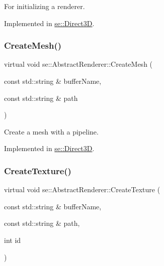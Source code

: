 For initializing a renderer. 

Implemented in \mbox{\hyperlink{classse_1_1_direct3_d_a0174f6e1436fa4171380cc603ca262f0}{se\+::\+Direct3D}}.

\mbox{\label{classse_1_1_abstract_renderer_a4a3e8836f7a8b1b35a5f7cb1b4231476}} 
\subsubsection{\texorpdfstring{Create\+Mesh()}{CreateMesh()}}
{\footnotesize\ttfamily virtual void se\+::\+Abstract\+Renderer\+::\+Create\+Mesh (\begin{DoxyParamCaption}\item[{const std\+::string \&}]{buffer\+Name,  }\item[{const std\+::string \&}]{path }\end{DoxyParamCaption})\hspace{0.3cm}{\ttfamily [pure virtual]}}

Create a mesh with a pipeline. 

Implemented in \mbox{\hyperlink{classse_1_1_direct3_d_aab3d1a8b4ee8812dea07f5ecda5efc42}{se\+::\+Direct3D}}.

\mbox{\label{classse_1_1_abstract_renderer_a89f2efd2ee68cfb6735e51ce87206dfd}} 
\subsubsection{\texorpdfstring{Create\+Texture()}{CreateTexture()}}
{\footnotesize\ttfamily virtual void se\+::\+Abstract\+Renderer\+::\+Create\+Texture (\begin{DoxyParamCaption}\item[{const std\+::string \&}]{buffer\+Name,  }\item[{const std\+::string \&}]{path,  }\item[{int}]{id }\end{DoxyParamCaption})\hspace{0.3cm}{\ttfamily [pure virtual]}}

